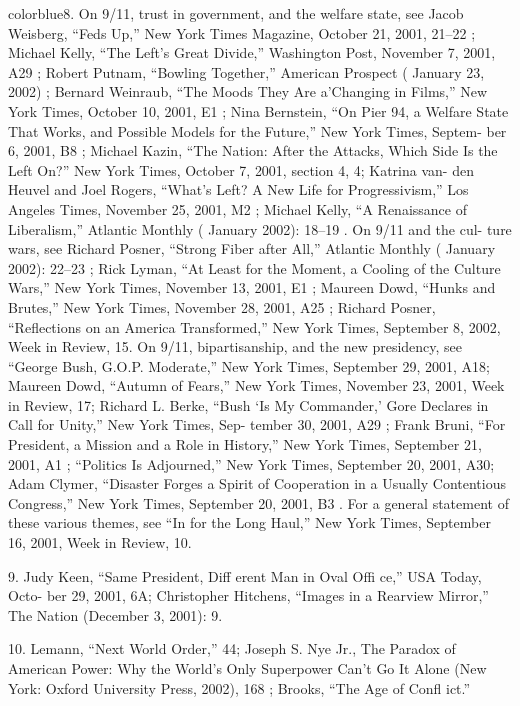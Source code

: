 	{color{blue}8}. On 9/11, trust in government, and the welfare state, see Jacob Weisberg, “Feds Up,” New York Times Magazine, October 21, 2001, 21–22 ; Michael Kelly, “The Left’s Great Divide,” Washington Post, November 7, 2001, A29 ; Robert Putnam, “Bowling Together,” American Prospect ( January 23, 2002) ; Bernard Weinraub, “The Moods They Are a’Changing in Films,” New York Times, October 10, 2001, E1 ; Nina Bernstein, “On Pier 94, a Welfare State That Works, and Possible Models for the Future,” New York Times, Septem- ber 6, 2001, B8 ; Michael Kazin, “The Nation: After the Attacks, Which Side Is the Left On?” New York Times, October 7, 2001, section 4, 4; Katrina van- den Heuvel and Joel Rogers, “What’s Left? A New Life for Progressivism,” Los Angeles Times, November 25, 2001, M2 ; Michael Kelly, “A Renaissance of Liberalism,” Atlantic Monthly ( January 2002): 18–19 . On 9/11 and the cul- ture wars, see Richard Posner, “Strong Fiber after All,” Atlantic Monthly ( January 2002): 22–23 ; Rick Lyman, “At Least for the Moment, a Cooling of the Culture Wars,” New York Times, November 13, 2001, E1 ; Maureen Dowd, “Hunks and Brutes,” New York Times, November 28, 2001, A25 ; Richard Posner, “Reflections on an America Transformed,” New York Times, September 8, 2002, Week in Review, 15. On 9/11, bipartisanship, and the new presidency, see “George Bush, G.O.P. Moderate,” New York Times, September 29, 2001, A18; Maureen Dowd, “Autumn of Fears,” New York Times, November 23, 2001, Week in Review, 17; Richard L. Berke, “Bush ‘Is My Commander,’ Gore Declares in Call for Unity,” New York Times, Sep- tember 30, 2001, A29 ; Frank Bruni, “For President, a Mission and a Role in History,” New York Times, September 21, 2001, A1 ; “Politics Is Adjourned,” New York Times, September 20, 2001, A30; Adam Clymer, “Disaster Forges a Spirit of Cooperation in a Usually Contentious Congress,” New York Times, September 20, 2001, B3 . For a general statement of these various themes, see “In for the Long Haul,” New York Times, September 16, 2001, Week in Review, 10.


	{\color{blue}9}. Judy Keen, “Same President, Diff erent Man in Oval Offi ce,” USA Today, Octo- ber 29, 2001, 6A; Christopher Hitchens, “Images in a Rearview Mirror,” The Nation (December 3, 2001): 9.


	{\color{blue}10}. Lemann, “Next World Order,” 44; Joseph S. Nye Jr., The Paradox of American Power: Why the World’s Only Superpower Can’t Go It Alone (New York: Oxford University Press, 2002), 168 ; Brooks, “The Age of Confl ict.”


